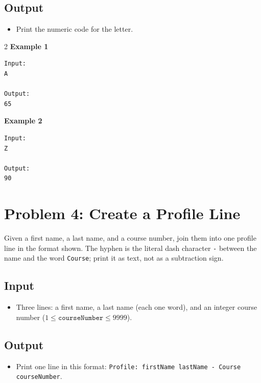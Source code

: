 \documentclass[12pt,oneside,openany]{article}
\begin{document}
\subsection*{Output}
\begin{itemize}
    \item Print the numeric code for the letter.
\end{itemize}

\vspace{0.2cm}

\begin{example*}{}{}
\begin{multicols}{2}
\textbf{Example 1}
\begin{verbatim}
Input:
A

Output:
65
\end{verbatim}
\textbf{Example 2}
\begin{verbatim}
Input:
Z

Output:
90
\end{verbatim}
\end{multicols}
\end{example*}
\newpage
\section*{Problem 4: Create a Profile Line}

Given a first name, a last name, and a course number, join them into one profile line in the format shown. The hyphen is the literal dash character \texttt{-} between the name and the word \texttt{Course}; print it as text, not as a subtraction sign.

\subsection*{Input}
\begin{itemize}
    \item Three lines: a first name, a last name (each one word), and an integer course number ($1 \leq \texttt{courseNumber} \leq 9999$).
\end{itemize}

\subsection*{Output}
\begin{itemize}
    \item Print one line in this format: \texttt{Profile: firstName lastName - Course courseNumber}.
\end{itemize}
\end{document}
